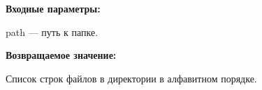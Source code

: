 \textbf{Входные параметры:}

path --- путь к папке.

\textbf{Возвращаемое значение:}

Список строк файлов в директории в алфавитном порядке.